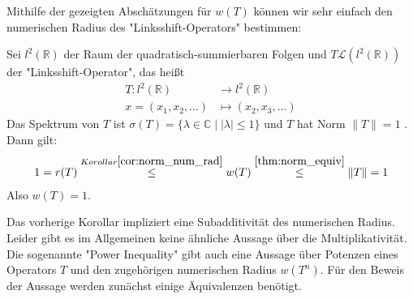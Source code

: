 Mithilfe der gezeigten Abschätzungen für $w(T)$ können wir sehr einfach den numerischen Radius des "Linksshift-Operators" bestimmen:

\begin{ex} \label{ex:leftshift}
	Sei $l^2(\mathbb{R})$ der Raum der quadratisch-summierbaren Folgen und $T \mathcal{L}(l^2(\mathbb{R}))$ der "Linksshift-Operator", das heißt
	\begin{align*}
		T: l^2(\mathbb{R}) &\to l^2(\mathbb{R}) \\
		x=(x_1,x_2,...) &\mapsto (x_2, x_3, ...)
	\end{align*}
	Das Spektrum von $T$ ist $\sigma(T)=\{ \lambda \in \mathbb{C} \; | \; |\lambda| \le 1\}$ und $T$ hat Norm $\|T\|=1$ \parencite[][Kapitel 20.2]{lax14functional}. Dann gilt:
	\begin{align*}
		1=r(T) \overset{Korollar \ref{cor:norm_num_rad}}{\le} w(T) \overset{\ref{thm:norm_equiv}}{\le} \|T\| = 1
	\end{align*}
	Also $w(T)=1$.
\end{ex}

Das vorherige Korollar impliziert eine Subadditivität des numerischen Radius. Leider gibt es im Allgemeinen keine ähnliche Aussage über die Multiplikativität. Die sogenannte "Power Inequality" gibt auch eine Aussage über Potenzen eines Operators $T$ und den zugehörigen numerischen Radius $w(T^n)$. Für den Beweis der Aussage werden zunächst einige Äquivalenzen benötigt.

